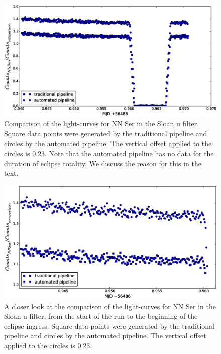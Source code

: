 \begin{figure}
\centering
\includegraphics[width=140mm]{images/nn_ser_compare_b.eps}
\caption{Comparison of the light-curves for NN Ser in the Sloan u filter. Square data points were generated by the traditional pipeline and circles by the automated pipeline. The vertical offset applied to the circles is 0.23. Note that the automated pipeline has no data for the duration of eclipse totality. We discuss the reason for this in the text.}
\label{fig:comparepipelines_b}
\end{figure}

\begin{figure}
\centering
\includegraphics[width=140mm]{images/nn_ser_compare_zoom_b.eps}
\caption{A closer look at the comparison of the light-curves for NN Ser in the Sloan u filter, from the start of the run to the beginning of the eclipse ingress. Square data points were generated by the traditional pipeline and circles by the automated pipeline. The vertical offset applied to the circles is 0.23. }
\label{fig:comparepipelines_zoom_b}
\end{figure}

